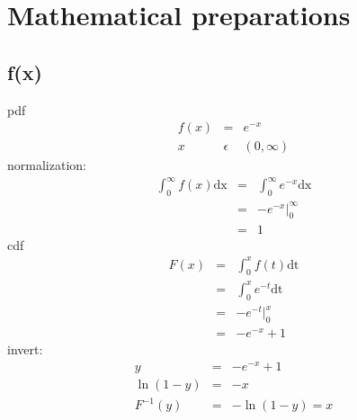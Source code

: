 \documentclass{article}
\begin{document}
	\section{Mathematical preparations}
	\subsection{f(x)}
		pdf
		\begin{eqnarray*}
			f(x)&=&e^{-x}\\
			x&\epsilon&(0,\infty)
		\end{eqnarray*}
		normalization:
		\begin{eqnarray*}
			\int_0^\infty f(x)\mathrm{dx}&=&\int_0^\infty e^{-x}\mathrm{dx}\\
			&=&-e^{-x}|_0^\infty\\
			&=&1
		\end{eqnarray*}
		cdf
		\begin{eqnarray*}
			F(x)&=&\int_0^x f(t)\mathrm{dt}\\
			&=&\int_0^x e^{-t}\mathrm{dt}\\
			&=&-e^{-t}|_0^x\\
			&=&-e^{-x}+1
		\end{eqnarray*}
		invert:
		\begin{eqnarray*}
			y&=&-e^{-x}+1\\
			\ln(1-y)&=&-x\\
			F^{-1}(y)&=&-\ln(1-y)=x
		\end{eqnarray*}
\end{document}
